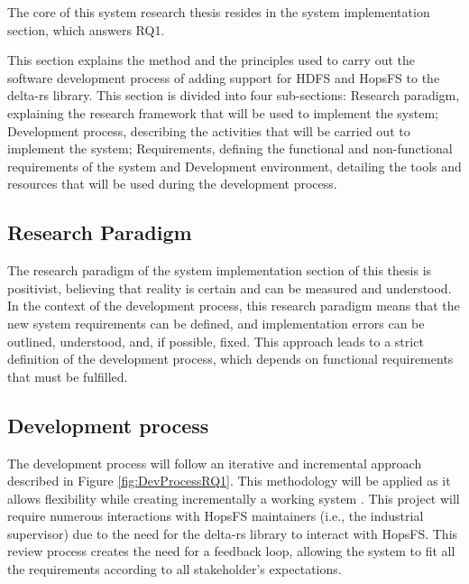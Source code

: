 The core of this system research thesis resides in the system implementation section, which answers RQ1.

This section explains the method and the principles used to carry out the software development process of adding support for \gls{HDFS} and \gls{HopsFS} to the delta-rs library. This section is divided into four sub-sections: Research paradigm, explaining the research framework that will be used to implement the system; Development process, describing the activities that will be carried out to implement the system; Requirements, defining the functional and non-functional requirements of the system and Development environment, detailing the tools and resources that will be used during the development process.

\subsection{Research Paradigm}
The research paradigm of the system implementation section of this thesis is positivist, believing that reality is certain and can be measured and understood. 
In the context of the development process, this research paradigm means that the new system requirements can be defined, and implementation errors can be outlined, understood, and, if possible, fixed. This approach leads to a strict definition of the development process, which depends on functional requirements that must be fulfilled.

\subsection{Development process}
\label{subsec:dev_process}
The development process will follow an iterative and incremental approach described in Figure \ref{fig:DevProcessRQ1}. This methodology will be applied as it allows flexibility while creating incrementally a working system \cite{despa2014comparative}. This project will require numerous interactions with \gls{HopsFS} maintainers (i.e., the industrial supervisor) due to the need for the delta-rs library to interact with \gls{HopsFS}. This review process creates the need for a feedback loop, allowing the system to fit all the requirements according to all stakeholder's expectations.

